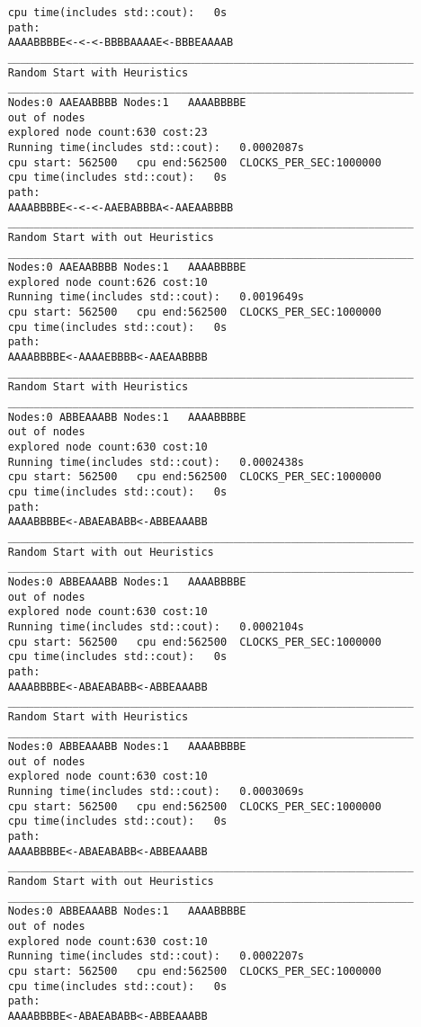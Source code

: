 \documentclass[12pt]{article}
\begin{document}
\begin{lstlisting}
	cpu time(includes std::cout):	0s
	path:
	AAAABBBBE<-<-<-BBBBAAAAE<-BBBEAAAAB
	_______________________________________________________________
	Random Start with Heuristics
	_______________________________________________________________
	Nodes:0	AAEAABBBB Nodes:1	AAAABBBBE
	out of nodes
	explored node count:630 cost:23
	Running time(includes std::cout):	0.0002087s
	cpu start: 562500	cpu end:562500	CLOCKS_PER_SEC:1000000
	cpu time(includes std::cout):	0s
	path:
	AAAABBBBE<-<-<-AAEBABBBA<-AAEAABBBB
	_______________________________________________________________
	Random Start with out Heuristics
	_______________________________________________________________
	Nodes:0	AAEAABBBB Nodes:1	AAAABBBBE
	explored node count:626 cost:10
	Running time(includes std::cout):	0.0019649s
	cpu start: 562500	cpu end:562500	CLOCKS_PER_SEC:1000000
	cpu time(includes std::cout):	0s
	path:
	AAAABBBBE<-AAAAEBBBB<-AAEAABBBB
	_______________________________________________________________
	Random Start with Heuristics
	_______________________________________________________________
	Nodes:0	ABBEAAABB Nodes:1	AAAABBBBE
	out of nodes
	explored node count:630 cost:10
	Running time(includes std::cout):	0.0002438s
	cpu start: 562500	cpu end:562500	CLOCKS_PER_SEC:1000000
	cpu time(includes std::cout):	0s
	path:
	AAAABBBBE<-ABAEABABB<-ABBEAAABB
	_______________________________________________________________
	Random Start with out Heuristics
	_______________________________________________________________
	Nodes:0	ABBEAAABB Nodes:1	AAAABBBBE
	out of nodes
	explored node count:630 cost:10
	Running time(includes std::cout):	0.0002104s
	cpu start: 562500	cpu end:562500	CLOCKS_PER_SEC:1000000
	cpu time(includes std::cout):	0s
	path:
	AAAABBBBE<-ABAEABABB<-ABBEAAABB
	_______________________________________________________________
	Random Start with Heuristics
	_______________________________________________________________
	Nodes:0	ABBEAAABB Nodes:1	AAAABBBBE
	out of nodes
	explored node count:630 cost:10
	Running time(includes std::cout):	0.0003069s
	cpu start: 562500	cpu end:562500	CLOCKS_PER_SEC:1000000
	cpu time(includes std::cout):	0s
	path:
	AAAABBBBE<-ABAEABABB<-ABBEAAABB
	_______________________________________________________________
	Random Start with out Heuristics
	_______________________________________________________________
	Nodes:0	ABBEAAABB Nodes:1	AAAABBBBE
	out of nodes
	explored node count:630 cost:10
	Running time(includes std::cout):	0.0002207s
	cpu start: 562500	cpu end:562500	CLOCKS_PER_SEC:1000000
	cpu time(includes std::cout):	0s
	path:
	AAAABBBBE<-ABAEABABB<-ABBEAAABB

\end{lstlisting}
\end{document}
